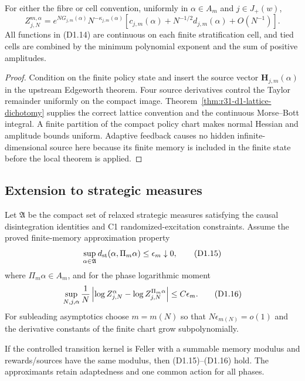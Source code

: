 \begin{theorem}
\label{thm:r31-d1-finite-policy}
For either the fibre or cell convention, uniformly in
$\alpha\in A_m$ and $j\in J_+(w)$,
\[
 Z_{j,N}^{m,\alpha}
 =e^{NG_{j,m}(\alpha)}N^{-\kappa_{j,m}(\alpha)}
 [c_{j,m}(\alpha)+N^{-1/2}d_{j,m}(\alpha)+O(N^{-1})].      \tag{D1.14}
\]
All functions in (D1.14) are continuous on each finite stratification cell,
and tied cells are combined by the minimum polynomial exponent and the sum of
positive amplitudes.
\end{theorem}

\begin{proof}
Condition on the finite policy state and insert the source vector
$\mathbf H_{j,m}(\alpha)$ in the upstream Edgeworth theorem.  Four source
derivatives control the Taylor remainder uniformly on the compact image.
Theorem~\ref{thm:r31-d1-lattice-dichotomy} supplies the correct lattice
convention and the continuous Morse--Bott integral.  A finite partition of the
compact policy chart makes normal Hessian and amplitude bounds uniform.
Adaptive feedback causes no hidden infinite-dimensional source here because
its finite memory is included in the finite state before the local theorem is
applied.
\end{proof}

\subsection{Extension to strategic measures}

Let $\mathfrak A$ be the compact set of relaxed strategic measures satisfying
the causal disintegration identities and C1 randomized-excitation constraints.
Assume the proved finite-memory approximation property
\[
 \sup_{\alpha\in\mathfrak A}
 d_{\rm st}(\alpha,\Pi_m\alpha)\le\epsilon_m\downarrow0,                 \tag{D1.15}
\]
where $\Pi_m\alpha\in A_m$, and for the phase logarithmic moment
\[
 \sup_{N,j,\alpha}{1\over N}
 \left|\log Z_{j,N}^{\alpha}-\log Z_{j,N}^{\Pi_m\alpha}\right|
 \le C\epsilon_m.                                        \tag{D1.16}
\]
For subleading asymptotics choose $m=m(N)$ so that
$N\epsilon_{m(N)}=o(1)$ and the derivative constants of the finite chart grow
subpolynomially.

\begin{lemma}
\label{lem:r31-d1-policy-approx}
If the controlled transition kernel is Feller with a summable memory modulus
and rewards/sources have the same modulus, then (D1.15)--(D1.16) hold.  The
approximants retain adaptedness and one common action for all phases.
\end{lemma}

